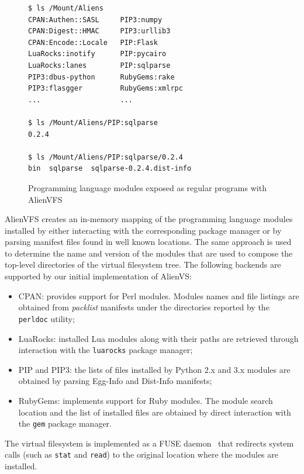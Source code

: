 \documentclass[sigplan, anonymous, 10pt]{acmart}
\begin{document}
\begin{figure}
    \begin{Verbatim}[frame=single]
$ ls /Mount/Aliens
CPAN:Authen::SASL     PIP3:numpy
CPAN:Digest::HMAC     PIP3:urllib3
CPAN:Encode::Locale   PIP:Flask
LuaRocks:inotify      PIP:pycairo
LuaRocks:lanes        PIP:sqlparse
PIP3:dbus-python      RubyGems:rake
PIP3:flasgger         RubyGems:xmlrpc
...                   ...

$ ls /Mount/Aliens/PIP:sqlparse
0.2.4

$ ls /Mount/Aliens/PIP:sqlparse/0.2.4
bin  sqlparse  sqlparse-0.2.4.dist-info
    \end{Verbatim}
    \caption{Programming language modules exposed as regular programs with AlienVFS}
    \label{fig:alienvfs}
\end{figure}

AlienVFS creates an in-memory mapping of the programming language modules installed
by either interacting with the corresponding package manager or by parsing manifest
files found in well known locations. The same approach is used to determine the
name and version of the modules that are used to compose the top-level directories
of the virtual filesystem tree. The following backends are supported by our initial
implementation of AlienVS:

\begin{itemize}
    \item CPAN: provides support for Perl modules. Modules names and file listings
        are obtained from \emph{packlist} manifests under the directories reported
        by the \texttt{perldoc} utility;
    \item LuaRocks: installed Lua modules along with their paths are retrieved
        through interaction with the \texttt{lua\-rocks} package manager;
    \item PIP and PIP3: the lists of files installed by Python 2.x and 3.x modules
        are obtained by parsing Egg-Info and Dist-Info manifests;
    \item RubyGems: implements support for Ruby modules. The module search location
        and the list of installed files are obtained by direct interaction with the
        \texttt{gem} package manager.
\end{itemize}

The virtual filesystem is implemented as a FUSE daemon~\cite{miklos2001:fuse} that
redirects system calls (such as \texttt{stat} and \texttt{read}) to the original
location where the modules are installed.
\end{document}

